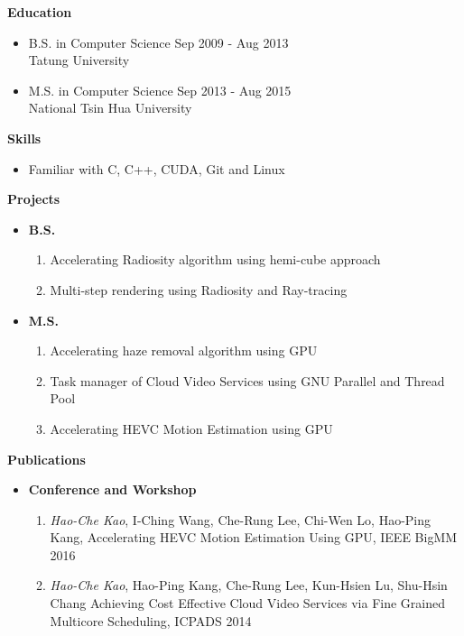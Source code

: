 \documentclass[a4paper,12pt]{report}
\begin{document}
{\Large \textbf{Education}}\hrulefill
\begin{itemize}
	\item B.S. in Computer Science \hfill Sep 2009 - Aug 2013\\
	Tatung University
	\item M.S. in Computer Science \hfill Sep 2013 - Aug 2015\\
	National Tsin Hua University
	
\end{itemize}
\vspace{3mm}

{\Large \textbf{Skills}}\hrulefill
\begin{itemize}
	\item Familiar with C, C++, CUDA, Git and Linux
\end{itemize}
\vspace{3mm}

{\Large \textbf{Projects}}\hrulefill
\begin{itemize}
	\item \textbf{B.S.} %
	\begin{enumerate}
		\item Accelerating Radiosity algorithm using hemi-cube approach 
		\item Multi-step rendering using Radiosity and Ray-tracing 
	\end{enumerate}
	\item \textbf{M.S.} %
	\begin{enumerate}
		\item Accelerating haze removal algorithm using GPU 
		\item Task manager of Cloud Video Services using GNU Parallel and Thread Pool
		\item Accelerating HEVC Motion Estimation using GPU 
	\end{enumerate}
\end{itemize}
\vspace{3mm}

{\Large \textbf{Publications}}\hrulefill
\begin{itemize}
	\item \textbf{Conference and Workshop}
	\begin{enumerate}
		\item \emph{Hao-Che Kao}, I-Ching Wang, Che-Rung Lee, Chi-Wen Lo, Hao-Ping Kang, Accelerating HEVC Motion Estimation Using GPU, IEEE BigMM 2016
		\item \emph{Hao-Che Kao}, Hao-Ping Kang, Che-Rung Lee, Kun-Hsien Lu, Shu-Hsin Chang Achieving Cost Effective Cloud Video Services via Fine Grained Multicore Scheduling, ICPADS 2014	
	\end{enumerate}
\end{itemize}
\vspace{3mm}
\end{document}
